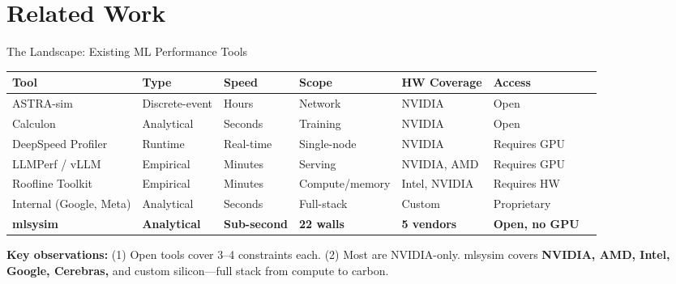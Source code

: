 
\section{Related Work}

\begin{frame}{The Landscape: Existing ML Performance Tools}
\centering
\scriptsize
\begin{tabular}{@{}lllllll@{}}
\toprule
\textbf{Tool} & \textbf{Type} & \textbf{Speed} & \textbf{Scope} & \textbf{HW Coverage} & \textbf{Access} \\
\midrule
ASTRA-sim        & Discrete-event   & Hours      & Network              & NVIDIA          & Open \\
Calculon         & Analytical       & Seconds    & Training             & NVIDIA          & Open \\
DeepSpeed Profiler & Runtime        & Real-time  & Single-node          & NVIDIA          & Requires GPU \\
LLMPerf / vLLM   & Empirical        & Minutes    & Serving              & NVIDIA, AMD     & Requires GPU \\
Roofline Toolkit  & Empirical        & Minutes    & Compute/memory       & Intel, NVIDIA   & Requires HW \\
Internal (Google, Meta) & Analytical & Seconds    & Full-stack           & Custom          & Proprietary \\
\rowcolor{crimson!12}
\textbf{mlsysim} & \textbf{Analytical} & \textbf{Sub-second} & \textbf{22 walls} & \textbf{5 vendors} & \textbf{Open, no GPU} \\
\bottomrule
\end{tabular}

\vspace{0.8em}
\small
\textbf{Key observations:} (1) Open tools cover 3--4 constraints each.
(2) Most are NVIDIA-only. mlsysim covers \textbf{NVIDIA, AMD, Intel, Google, Cerebras,}
and custom silicon---full stack from compute to carbon.
\end{frame}

